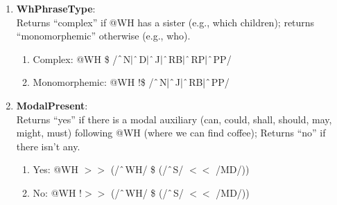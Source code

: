 \begin{enumerate}
    \item \textbf{WhPhraseType}: \\
    Returns ``complex'' if @WH has a sister (e.g., \textsf{which children}); returns ``monomorphemic'' otherwise (e.g., \textsf{who}).
        \begin{enumerate}  
            \item Complex: @WH \$ /$\string^$N$|\string^$D$|\string^$J$|\string^$RB$|\string^$RP$|\string^$PP/
            \item Monomorphemic: @WH !\$ /$\string^$N$|\string^$J$|\string^$RB$|\string^$PP/
        \end{enumerate}

    \item \textbf{ModalPresent}: \\
    Returns ``yes'' if there is a modal auxiliary (\textsf{can}, \textsf{could}, \textsf{shall}, \textsf{should}, \textsf{may}, \textsf{might}, \textsf{must}) following @WH (\textsf{where we can find coffee}); Returns ``no'' if there isn't any. 
        \begin{enumerate}
            \item Yes: @WH $>\!\!>$ (/$\string^$WH/ \$ (/$\string^$S/ $<\!\!<$ /MD/))
            \item No: @WH !$>\!\!>$ (/$\string^$WH/ \$ (/$\string^$S/ $<\!\!<$ /MD/))
        \end{enumerate}
        

\end{enumerate}
